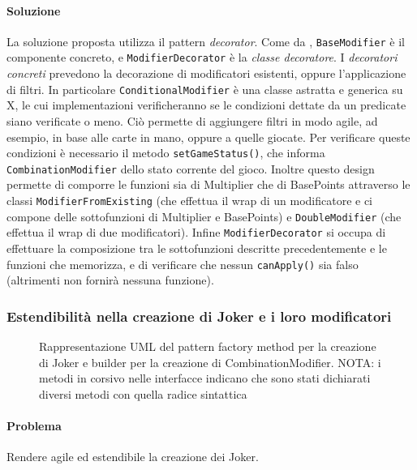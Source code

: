\documentclass[a4paper,12pt]{report}
\begin{document}
\paragraph{Soluzione}
La soluzione proposta utilizza il pattern \textit{decorator}. Come da , \texttt{BaseModifier} è il componente concreto, e \texttt{ModifierDecorator} è la \textit{classe decoratore}. I \textit{decoratori concreti} prevedono la decorazione di modificatori esistenti, oppure l’applicazione di filtri. In particolare \texttt{ConditionalModifier} è una classe astratta e generica su X, le cui implementazioni verificheranno se le condizioni dettate da un predicate siano verificate o meno. Ciò permette di aggiungere filtri in modo agile, ad esempio, in base alle carte in mano, oppure a quelle giocate. Per verificare queste condizioni è necessario il metodo \texttt{setGameStatus()}, che informa \texttt{CombinationModifier} dello stato corrente del gioco.
Inoltre questo design permette di comporre le funzioni sia di Multiplier che di BasePoints attraverso le classi \texttt{ModifierFromExisting} (che effettua il wrap di un modificatore e ci compone delle sottofunzioni di Multiplier e BasePoints) e \texttt{DoubleModifier} (che effettua il wrap di due modificatori). 
Infine \texttt{ModifierDecorator} si occupa di effettuare la composizione tra le sottofunzioni descritte precedentemente e le funzioni che memorizza, e di verificare che nessun \texttt{canApply()} sia falso (altrimenti non fornirà nessuna funzione).
\subsubsection*{Estendibilità nella creazione di Joker e i loro modificatori}
\begin{figure}[H]
	\centering{}
	
	\caption{Rappresentazione UML del pattern factory method per la creazione di Joker e builder per la creazione di CombinationModifier. NOTA: i metodi in corsivo nelle interfacce indicano che sono stati dichiarati diversi metodi con quella radice sintattica}
	\label{img:JokerFactory}
\end{figure}
\paragraph{Problema}
Rendere agile ed estendibile la creazione dei Joker.
\end{document}

